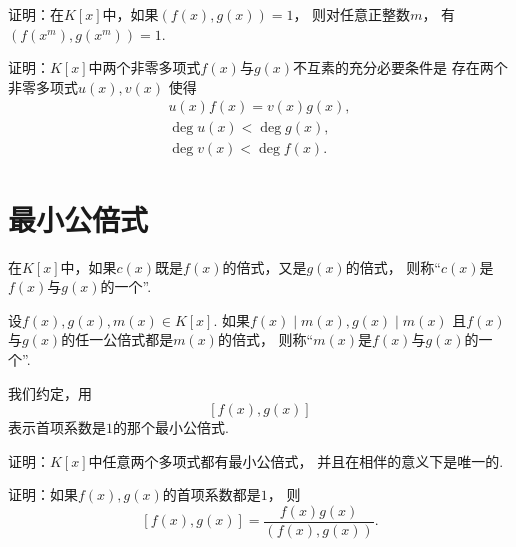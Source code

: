 \begin{example}
证明：在\(K[x]\)中，如果\((f(x),g(x))=1\)，
则对任意正整数\(m\)，
有\((f(x^m),g(x^m))=1\).
\end{example}

\begin{example}
证明：\(K[x]\)中两个非零多项式\(f(x)\)与\(g(x)\)不互素的充分必要条件是
存在两个非零多项式\(u(x),v(x)\)
使得\begin{gather*}
	u(x) f(x) = v(x) g(x), \\
	\deg u(x) < \deg g(x), \\
	\deg v(x) < \deg f(x).
\end{gather*}
\end{example}

\section{最小公倍式}
在\(K[x]\)中，如果\(c(x)\)既是\(f(x)\)的倍式，又是\(g(x)\)的倍式，
则称“\(c(x)\)是\(f(x)\)与\(g(x)\)的一个”.

\begin{definition}
设\(f(x),g(x),m(x) \in K[x]\).
如果\(f(x) \mid m(x),
g(x) \mid m(x)\)
且\(f(x)\)与\(g(x)\)的任一公倍式都是\(m(x)\)的倍式，
则称“\(m(x)\)是\(f(x)\)与\(g(x)\)的一个”.
\end{definition}

我们约定，用\[
	[f(x), g(x)]
\]表示首项系数是\(1\)的那个最小公倍式.

\begin{example}
证明：\(K[x]\)中任意两个多项式都有最小公倍式，
并且在相伴的意义下是唯一的.
\end{example}

\begin{example}
证明：如果\(f(x),g(x)\)的首项系数都是\(1\)，
则\[
	[f(x),g(x)]
	= \frac{f(x) g(x)}{(f(x),g(x))}.
\]
\end{example}
